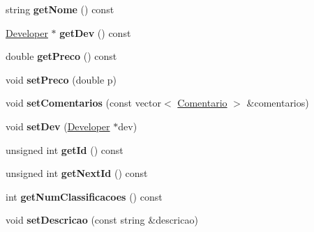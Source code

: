 \begin{DoxyCompactItemize}
\item 
\hypertarget{class_app_a7b94ca7878eb536a1d1b1448c2072bea}{string {\bfseries get\+Nome} () const }\label{class_app_a7b94ca7878eb536a1d1b1448c2072bea}

\item 
\hypertarget{class_app_a94de3c0569d8c300a634c5e058da70da}{\hyperlink{class_developer}{Developer} $\ast$ {\bfseries get\+Dev} () const }\label{class_app_a94de3c0569d8c300a634c5e058da70da}

\item 
\hypertarget{class_app_a203cc8ebea02cf4cabb736c3c4e8bc51}{double {\bfseries get\+Preco} () const }\label{class_app_a203cc8ebea02cf4cabb736c3c4e8bc51}

\item 
\hypertarget{class_app_ab9723a9ef1383d41b9960e07de4c5691}{void {\bfseries set\+Preco} (double p)}\label{class_app_ab9723a9ef1383d41b9960e07de4c5691}

\item 
\hypertarget{class_app_a40d8afcc9663054f4f5445a37dfd542d}{void {\bfseries set\+Comentarios} (const vector$<$ \hyperlink{class_comentario}{Comentario} $>$ \&comentarios)}\label{class_app_a40d8afcc9663054f4f5445a37dfd542d}

\item 
\hypertarget{class_app_aa2d4de1233b4a07def3cdae0d165d4cf}{void {\bfseries set\+Dev} (\hyperlink{class_developer}{Developer} $\ast$dev)}\label{class_app_aa2d4de1233b4a07def3cdae0d165d4cf}

\item 
\hypertarget{class_app_a17d1e4e52f2357b25437d21d21728bcb}{unsigned int {\bfseries get\+Id} () const }\label{class_app_a17d1e4e52f2357b25437d21d21728bcb}

\item 
\hypertarget{class_app_ae8bc0359346587f5e98885e4bdba3db0}{unsigned int {\bfseries get\+Next\+Id} () const }\label{class_app_ae8bc0359346587f5e98885e4bdba3db0}

\item 
\hypertarget{class_app_afca72f5119a5fbb1c7972d8085abc2c7}{int {\bfseries get\+Num\+Classificacoes} () const }\label{class_app_afca72f5119a5fbb1c7972d8085abc2c7}

\item 
\hypertarget{class_app_af0140ea32801ddf481e61fda65024ba8}{void {\bfseries set\+Descricao} (const string \&descricao)}\label{class_app_af0140ea32801ddf481e61fda65024ba8}

\end{DoxyCompactItemize}
